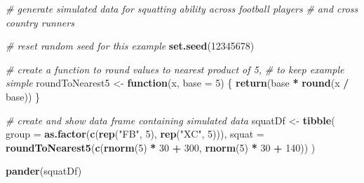 \documentclass[]{book}
\newenvironment{Shaded}{\begin{snugshade}}{\end{snugshade}}
\newcommand{\KeywordTok}[1]{\textcolor[rgb]{0.13,0.29,0.53}{\textbf{#1}}}
\newcommand{\DataTypeTok}[1]{\textcolor[rgb]{0.13,0.29,0.53}{#1}}
\newcommand{\DecValTok}[1]{\textcolor[rgb]{0.00,0.00,0.81}{#1}}
\newcommand{\StringTok}[1]{\textcolor[rgb]{0.31,0.60,0.02}{#1}}
\newcommand{\CommentTok}[1]{\textcolor[rgb]{0.56,0.35,0.01}{\textit{#1}}}
\newcommand{\ControlFlowTok}[1]{\textcolor[rgb]{0.13,0.29,0.53}{\textbf{#1}}}
\newcommand{\OperatorTok}[1]{\textcolor[rgb]{0.81,0.36,0.00}{\textbf{#1}}}
\newcommand{\NormalTok}[1]{#1}
\theoremstyle{definition}
\theoremstyle{definition}
\theoremstyle{definition}
\theoremstyle{remark}
\begin{document}
\begin{Shaded}
\begin{Highlighting}[]
\CommentTok{# generate simulated data for squatting ability across football players }
\CommentTok{# and cross country runners}

\CommentTok{# reset random seed for this example}
\KeywordTok{set.seed}\NormalTok{(}\DecValTok{12345678}\NormalTok{)}

\CommentTok{# create a function to round values to nearest product of 5,}
\CommentTok{# to keep example simple}
\NormalTok{roundToNearest5 <-}\StringTok{ }\ControlFlowTok{function}\NormalTok{(x, }\DataTypeTok{base =} \DecValTok{5}\NormalTok{) \{}
  \KeywordTok{return}\NormalTok{(base }\OperatorTok{*}\StringTok{ }\KeywordTok{round}\NormalTok{(x }\OperatorTok{/}\StringTok{ }\NormalTok{base))}
\NormalTok{\}}

\CommentTok{# create and show data frame containing simulated data}
\NormalTok{squatDf <-}\StringTok{ }\KeywordTok{tibble}\NormalTok{(}
  \DataTypeTok{group =} \KeywordTok{as.factor}\NormalTok{(}\KeywordTok{c}\NormalTok{(}\KeywordTok{rep}\NormalTok{(}\StringTok{"FB"}\NormalTok{, }\DecValTok{5}\NormalTok{), }\KeywordTok{rep}\NormalTok{(}\StringTok{"XC"}\NormalTok{, }\DecValTok{5}\NormalTok{))),}
  \DataTypeTok{squat =} \KeywordTok{roundToNearest5}\NormalTok{(}\KeywordTok{c}\NormalTok{(}\KeywordTok{rnorm}\NormalTok{(}\DecValTok{5}\NormalTok{) }\OperatorTok{*}\StringTok{ }\DecValTok{30} \OperatorTok{+}\StringTok{ }\DecValTok{300}\NormalTok{, }\KeywordTok{rnorm}\NormalTok{(}\DecValTok{5}\NormalTok{) }\OperatorTok{*}\StringTok{ }\DecValTok{30} \OperatorTok{+}\StringTok{ }\DecValTok{140}\NormalTok{))}
\NormalTok{)}

\KeywordTok{pander}\NormalTok{(squatDf)}
\end{Highlighting}
\end{Shaded}
\end{document}
